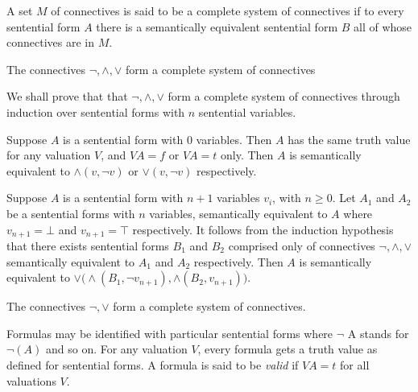 \documentclass[nobib,notoc]{tufte-handout}
\begin{document}
\begin{defi}
	A set \(M\) of connectives is said to be a complete system of connectives if to every sentential form \(A\) there is a semantically equivalent sentential form \(B\) all of whose connectives are in \(M\).
\end{defi}
\begin{thm}
	The connectives \(\neg, \wedge, \vee\) form a complete system of connectives
	\begin{IEEEproof}
		We shall prove that that \(\neg, \wedge, \vee \) form a complete system of connectives through induction over sentential forms with \(n\) sentential variables.\par
		Suppose \(A\) is a sentential form with \(0\) variables. Then \(A\) has the same truth value for any valuation \(V\), and \(VA=f\) or \(VA=t\) only. Then \(A\) is semantically equivalent to \(\wedge(v,\neg v)\) or \(\vee(v, \neg v)\) respectively.\par
		Suppose \(A\) is a sentential form with \(n+1\) variables \(v_i\), with \(n\geq 0\). Let \(A_1\) and \(A_2\) be a sentential forms with \(n\) variables, semantically equivalent to \(A\) where \(v_{n+1}=\bot\) and \(v_{n+1}=\top\) respectively. It follows from the induction hypothesis that there exists sentential forms \(B_1\) and \(B_2\) comprised only of connectives \(\neg, \wedge, \vee\) semantically equivalent to \(A_1\) and \(A_2\) respectively. Then \(A\) is semantically equivalent to \(\vee\bigl(\wedge(B_1,\neg v_{n+1}),\wedge(B_2, v_{n+1})\bigr)\).
	\end{IEEEproof}
\end{thm}
\begin{cor}
	The connectives \(\neg, \vee\) form a complete system of connectives.
\end{cor}
Formulas may be identified with particular sentential forms where \(\neg\) A stands for \(\neg(A)\) and so on. For any valuation \(V\), every formula gets a truth value as defined for sentential forms. A formula is said to be \emph{valid} if \(VA=t\) for all valuations \(V\).
\end{document}
